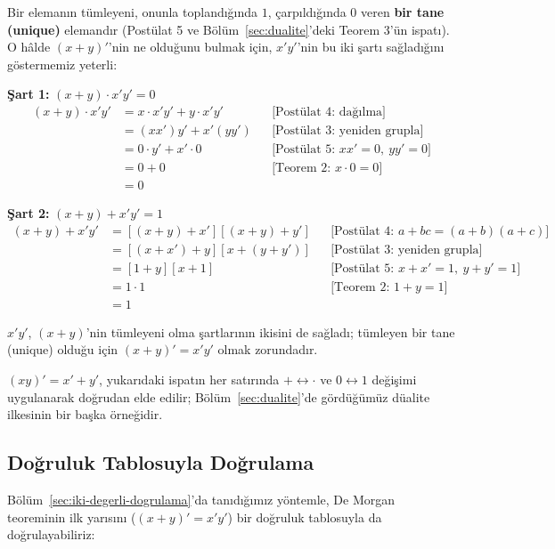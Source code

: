 \begin{ornek}[De Morgan'ın İlk Yarısının İspatı: $(x+y)'=x'y'$]
Bir elemanın tümleyeni, onunla toplandığında $1$, çarpıldığında $0$ veren \textbf{bir tane
(unique)}
elemandır (Postülat 5 ve Bölüm~\ref{sec:dualite}'deki Teorem 3'ün ispatı). O hâlde
$(x+y)'$'nin ne olduğunu bulmak için, $x'y'$'nin bu iki şartı sağladığını göstermemiz
yeterli:

\textbf{Şart 1: } $(x+y)\cdot x'y'=0$
\begin{align*}
(x+y)\cdot x'y' &= x\cdot x'y'+y\cdot x'y' & &\text{[Postülat 4: dağılma]}\\
    &= (xx')y'+x'(yy') & &\text{[Postülat 3: yeniden grupla]}\\
    &= 0\cdot y'+x'\cdot 0 & &\text{[Postülat 5: } xx'=0,\ yy'=0 \text{]}\\
    &= 0+0 & &\text{[Teorem 2: } x\cdot 0=0 \text{]}\\
    &= 0
\end{align*}

\textbf{Şart 2: } $(x+y)+x'y'=1$
\begin{align*}
(x+y)+x'y' &= [(x+y)+x'][(x+y)+y'] & &\text{[Postülat 4: } a+bc=(a+b)(a+c) \text{]}\\
    &= [(x+x')+y][x+(y+y')] & &\text{[Postülat 3: yeniden grupla]}\\
    &= [1+y][x+1] & &\text{[Postülat 5: } x+x'=1,\ y+y'=1 \text{]}\\
    &= 1\cdot 1 & &\text{[Teorem 2: } 1+y=1 \text{]}\\
    &= 1
\end{align*}

$x'y'$, $(x+y)$'nin tümleyeni olma şartlarının ikisini de sağladı; tümleyen bir tane (unique)
olduğu için $(x+y)'=x'y'$ olmak zorundadır.
\end{ornek}

\begin{bilginot}
$(xy)'=x'+y'$, yukarıdaki ispatın her satırında $+\leftrightarrow\cdot$ ve
$0\leftrightarrow 1$ değişimi uygulanarak doğrudan elde edilir; Bölüm~\ref{sec:dualite}'de
gördüğümüz düalite ilkesinin bir başka örneğidir.
\end{bilginot}

\subsection{Doğruluk Tablosuyla Doğrulama}
\label{sec:demorgan-truth-table}

Bölüm~\ref{sec:iki-degerli-dogrulama}'da tanıdığımız yöntemle, De Morgan teoreminin ilk
yarısını ($(x+y)'=x'y'$) bir doğruluk tablosuyla da doğrulayabiliriz:

